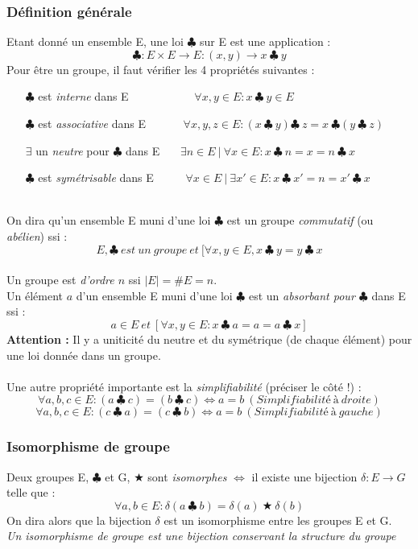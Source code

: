 \documentclass[12pt, a4paper, openany]{article}
\begin{document}
\subsubsection{Définition générale}
Etant donné un ensemble E, une loi $\clubsuit$ sur E est une application :
$$\clubsuit: E \times E \rightarrow E : (x,y) \rightarrow x\ \clubsuit\ y$$
Pour être un groupe, il faut vérifier les 4 propriétés suivantes : 
\begin{itemize}
\item[$\clubsuit$ est \textit{interne} dans E] \ \ \ \ \ \ \ \ \ \  \ $\forall x, y \in E : x\ \clubsuit\ y \in E$
\item[$\clubsuit$ est \textit{associative} dans E]\ \ \ \ \ \ $\forall x, y, z \in E : (x\ \clubsuit\ y)\clubsuit\ z =  x\ \clubsuit(y\ \clubsuit\ z)$
\item[$\exists$ un \textit{neutre} pour $\clubsuit$ dans E] \ \ \  $\exists n \in E\ |\ \forall x \in E : x\ \clubsuit\ n = x = n\ \clubsuit\ x$
\item[$\clubsuit$ est \textit{symétrisable} dans E]\ \ \ \ \ $\forall x \in E\ |\ \exists x' \in E : x\ \clubsuit\ x' = n = x'\ \clubsuit\ x$
\end{itemize}
\ \\
On dira qu'un ensemble E muni d'une loi $\clubsuit$ est un groupe \textit{commutatif} (ou \textit{abélien}) ssi :
$$E, \clubsuit\ est\ un\ groupe\ et\ [\forall x, y \in E, x\ \clubsuit\ y = y\ \clubsuit\ x$$
\ \\
Un groupe est \textit{d'ordre $n$} ssi $|E| = \#E = n$.\\
Un élément $a$ d'un ensemble E muni d'une loi $\clubsuit$ est un \textit{absorbant pour $\clubsuit$} dans E ssi :
$$a \in E\ et\ [\forall x, y \in E : x\ \clubsuit\ a = a = a\ \clubsuit\ x]$$
\textbf{Attention :} Il y a uniticité du neutre et du symétrique (de chaque élément) pour une loi donnée dans un groupe.\\ \\
Une autre propriété importante est la \textit{simplifiabilité} (préciser le côté !) :
$$\forall a, b, c \in E : (a\ \clubsuit\ c) = (b\ \clubsuit\ c) \Leftrightarrow a = b\ (Simplifiabilité\ à\ droite)$$
$$\forall a, b, c \in E : (c\ \clubsuit\ a) = (c\ \clubsuit\ b) \Leftrightarrow a = b\ (Simplifiabilité\ à\ gauche)$$

\subsubsection{Isomorphisme de groupe}
Deux groupes E, $\clubsuit$ et G, $\bigstar$ sont \textit{isomorphes} $\Leftrightarrow$ il existe une bijection $\delta : E \rightarrow G$ telle que : 
$$\forall a, b \in E : \delta (a\ \clubsuit\ b) = \delta(a)\ \bigstar\ \delta(b)$$
On dira alors que la bijection $\delta$ est un isomorphisme entre les groupes E et G.\\
\textit{Un isomorphisme de groupe est une bijection conservant la structure du groupe}
\end{document}
